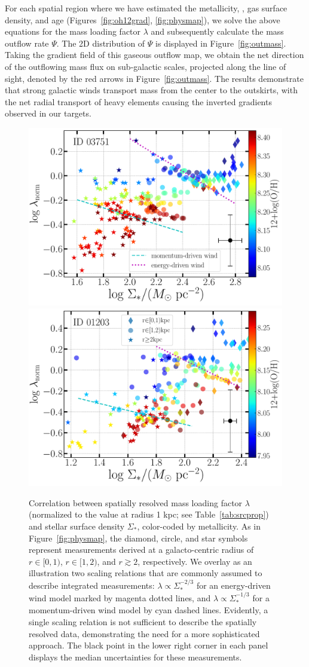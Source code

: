 For each spatial region where we have estimated the metallicity, \SFR, gas surface density, and age (Figures~\ref{fig:oh12grad}, 
\ref{fig:physmap}), we solve the above equations for the mass loading factor $\lambda$ and subsequently calculate the mass outflow 
rate $\Psi$.
The 2D distribution of $\Psi$ is displayed in Figure~\ref{fig:outmass}.
Taking the gradient field of this gaseous outflow map, we obtain the net direction of the outflowing mass flux on 
sub-galactic scales, projected along the line of sight, denoted by the red arrows in Figure~\ref{fig:outmass}.
The results demonstrate that strong galactic winds transport mass from the center to the outskirts, with the net 
radial transport of heavy elements causing the inverted gradients observed in our targets.

\begin{figure}
    \includegraphics[width=.5\textwidth]{fig/lamSDstar_ID03751.pdf}
    \includegraphics[width=.5\textwidth]{fig/lamSDstar_ID01203.pdf}
    \caption[Correlation between spatially resolved mass loading factor and stellar surface density.]
    {Correlation between spatially resolved mass loading factor $\lambda$ (normalized to the value at radius 1
    kpc; see Table~\ref{tab:srcprop}) and stellar surface density $\Sigma_\ast$, color-coded by metallicity.
    As in Figure~\ref{fig:physmap}, the diamond, circle, and star symbols represent measurements derived at a 
    galacto-centric radius
    of $r\in[0,1)$\kpc, $r\in[1,2)$\kpc, and $r\gtrsim2$\kpc, respectively.
    We overlay as an illustration two scaling relations that are commonly assumed to describe integrated measurements:
    $\lambda\propto\Sigma_\ast^{-2/3}$ for an energy-driven wind model marked by magenta dotted lines, and
    $\lambda\propto\Sigma_\ast^{-1/3}$ for a momentum-driven wind model by cyan dashed lines.
    Evidently, a single scaling relation is not sufficient to describe the spatially resolved data, demonstrating the need for a
    more sophisticated approach.
    The black point in the lower right corner in each panel displays the median uncertainties for these measurements.
    \label{fig:lamSDstar}}
\end{figure}

